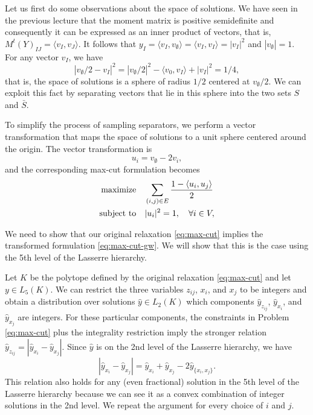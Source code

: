 \documentclass[a4paper,twoside,justified]{tufte-handout}
\begin{document}
Let us first do some observations about the space of solutions. We have seen in the previous lecture that the moment matrix is positive semidefinite and consequently it can be expressed as an inner product of vectors, that is, $M^t(Y)_{IJ}=\langle v_I, v_J \rangle$.  It follows that $y_I=\langle v_I,v_\emptyset \rangle = \langle v_I,v_I \rangle = | v_I |^2$ and $|v_{\emptyset}|=1$. For any vector $v_I$, we have
\[|v_\emptyset/2-v_I|^2=|v_\emptyset/2|^2-\langle v_0,v_I\rangle+|v_I|^2=1/4,\]
 that is, the space of solutions is a sphere of radius $1/2$ centered at $v_\emptyset/2$. We can exploit this fact by separating vectors that lie in this sphere into the two sets $S$ and $\bar S$.

To simplify the process of sampling separators, we perform a vector transformation that maps the space of solutions to a unit sphere centered around the origin. The vector transformation is
\[u_i=v_{\emptyset}-2v_i,\]
and the corresponding max-cut formulation becomes
\begin{alignat}{2}
\label{eq:max-cut-gw}
  \text{maximize}\hspace{1em}& \sum_{(i,j)\in E}\frac{1- \langle u_i,u_j \rangle}{2}\notag \\
  \text{subject to}\hspace{1em}& |u_i|^2 = 1, \quad \forall i\in V,
\end{alignat}

We need to show that our original relaxation \eqref{eq:max-cut} implies the transformed formulation \eqref{eq:max-cut-gw}. We will show that this is the case using the 5th level of the Lasserre hierarchy.

Let $K$ be the polytope defined by the original relaxation \eqref{eq:max-cut} and let $y \in L_5(K)$. We can restrict the three variables $z_{ij}$, $x_i$, and $x_j$ to be integers and obtain a distribution over solutions $\hat y \in L_2(K)$ which components $\hat y_{z_{ij}}$, $\hat y_{x_i}$, and $\hat y_{x_j}$ are integers. For these particular components, the constraints in Problem \eqref{eq:max-cut} plus the integrality restriction imply the stronger relation $\hat y_{z_{ij}}=|\hat y_{x_i}-\hat y_{x_j}|$. Since $\hat y$ is on the 2nd level of the Lasserre hierarchy, we have 
\[|\hat y_{x_i}-\hat y_{x_j}|=\hat y_{x_i} + \hat y_{x_j} - 2\hat y_{\{x_i,x_j\}}.\]
This relation also holds for any (even fractional) solution in the 5th level of the Lasserre hierarchy because we can see it as a convex combination of integer solutions in the 2nd level. We repeat the argument for every choice of $i$ and $j$.
\end{document}
